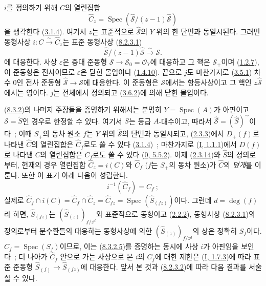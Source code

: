 $i$를 정의하기 위해 $\widehat{C}$의 열린집합
\begin{equation}
\label{II.8.3.2.4-ko}
  \widehat{C}_z=
  \operatorname{Spec}(\widehat{\mathcal{S}}/(z-1)\widehat{\mathcal{S}})
\tag{8.3.2.4}
\end{equation}
을 생각한다 (\hyperref[II.3.1.4-ko]{3.1.4}). 여기서 $z$는 표준적으로
$\widehat{\mathcal{S}}$의 $Y$ 위의 한 단면과 동일시된다. 그러면 동형사상
$i:C\xrightarrow{\sim}\widehat{C}_z$는 표준 동형사상
(\hyperref[II.8.2.3.1-ko]{8.2.3.1})
\[
  \widehat{\mathcal{S}}/(z-1)\widehat{\mathcal{S}}
  \xrightarrow{\sim}\mathcal{S}.
\]
에 대응한다. 사상 $\varepsilon$은 증대 준동형
$\mathcal{S}\to\mathcal{S}_0=\mathcal{O}_Y$에 대응하고 그 핵은
$\mathcal{S}_+$이며 (\hyperref[II.1.2.7-ko]{1.2.7}), 이 준동형은 전사이므로
$\varepsilon$은 닫힌 몰입이다
(\hyperref[II.1.4.10-ko]{1.4.10}). 끝으로 $j$도 마찬가지로
(\hyperref[II.3.5.1-ko]{3.5.1}) 차수 $0$인 전사 준동형
$\widehat{\mathcal{S}}\to\mathcal{S}$에 대응한다. 이 준동형은
$\mathcal{S}$에서는 항등사상이고 그 핵인 $z\widehat{\mathcal{S}}$에서는
영이다. $j$는 전체에서 정의되고 (\hyperref[II.3.6.2-ko]{3.6.2})에
의해 닫힌 몰입이다.

(\hyperref[II.8.3.2-ko]{8.3.2})의 나머지 주장들을 증명하기 위해서는
분명히 $Y=\operatorname{Spec}(A)$가 아핀이고
$\mathcal{S}=\widetilde{S}$인 경우로 한정할 수 있다. 여기서 $S$는
등급 $A$-대수이고, 따라서
$\widehat{\mathcal{S}}=(\widehat{S})^{\sim}$이다~; 이때 $S_+$의 동차
원소 $f$는 $Y$ 위의 $\widehat{\mathcal{S}}$의 단면과 동일시되고,
(\hyperref[II.2.3.3-ko]{2.3.3})에서 $D_+(f)$로 나타낸
$\widehat{C}$의 열린집합은 $\widehat{C}_f$로도 쓸 수 있다
(\hyperref[II.3.1.4-ko]{3.1.4})~; 마찬가지로
(\hyperref[I.1.1.1-ko]{I, 1.1.1})에서 $D(f)$로 나타낸 $C$의 열린집합은
$C_f$로도 쓸 수 있다 (\hyperref[0.5.5.2-ko]{0, 5.5.2}). 이제
(\hyperref[II.2.3.14-ko]{2.3.14})와 $\widehat{S}$의 정의로부터, 현재의
경우 열린집합 $\widehat{C}_z=i(C)$와 $\widehat{C}_f$ ($f$는 $S_+$의
동차 원소)가 $\widehat{C}$의 \emph{덮개}를 이룬다. 또한 이 표기 아래
다음이 성립한다.
\begin{equation}
\label{II.8.3.2.5-ko}
  i^{-1}(\widehat{C}_f)=C_f~;
\tag{8.3.2.5}
\end{equation}
실제로
$\widehat{C}_f\cap i(C)=\widehat{C}_f\cap\widehat{C}_z
=\widehat{C}_{fz}=\operatorname{Spec}(\widehat{S}_{(fz)})$이다. 그런데
$d=\deg(f)$라 하면, $\widehat{S}_{(fz)}$는
$(\widehat{S}_{(z)})_{f/z^d}$와 표준적으로 동형이고
(\hyperref[II.2.2.2-ko]{2.2.2}), 동형사상
(\hyperref[II.8.2.3.1-ko]{8.2.3.1})의 정의로부터 분수환들의 대응하는
동형사상에 의한 $(\widehat{S}_{(z)})_{f/z^d}$의 상은 정확히 $S_f$이다.
$C_f=\operatorname{Spec}(S_f)$이므로, 이는
(\hyperref[II.8.3.2.5-ko]{8.3.2.5})를 증명하는 동시에 사상 $i$가
아핀임을 보인다~; 더 나아가 $\widehat{C}_f$ 안으로 가는 사상으로 본
$i$의 $C_f$에 대한 제한은
(\hyperref[I.1.7.3-ko]{I, 1.7.3})에 따라 표준 준동형
$\widehat{S}_{(f)}\to\widehat{S}_{(fz)}$에 대응한다. 앞서 본 것과
(\hyperref[II.8.2.3.2-ko]{8.2.3.2})에 따라 다음 결과를 서술할 수 있다.

